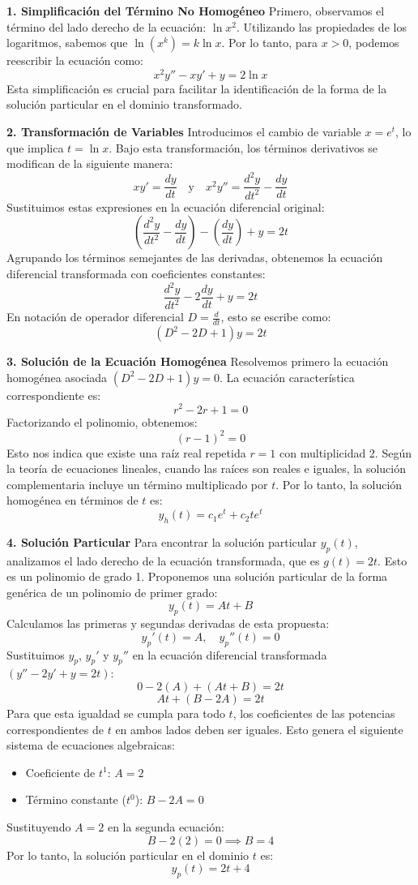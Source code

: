 \documentclass[a4paper]{article}
\begin{document}
\textbf{1. Simplificación del Término No Homogéneo}
Primero, observamos el término del lado derecho de la ecuación: $\ln x^2$. Utilizando las propiedades de los logaritmos, sabemos que $\ln(x^k) = k \ln x$. Por lo tanto, para $x > 0$, podemos reescribir la ecuación como:
$$
x^2y'' - xy' + y = 2 \ln x
$$
Esta simplificación es crucial para facilitar la identificación de la forma de la solución particular en el dominio transformado.

\textbf{2. Transformación de Variables}
Introducimos el cambio de variable $x = e^t$, lo que implica $t = \ln x$. Bajo esta transformación, los términos derivativos se modifican de la siguiente manera:
$$
x y' = \frac{dy}{dt} \quad \text{y} \quad x^2 y'' = \frac{d^2y}{dt^2} - \frac{dy}{dt}
$$
Sustituimos estas expresiones en la ecuación diferencial original:
$$
\left( \frac{d^2y}{dt^2} - \frac{dy}{dt} \right) - \left( \frac{dy}{dt} \right) + y = 2t
$$
Agrupando los términos semejantes de las derivadas, obtenemos la ecuación diferencial transformada con coeficientes constantes:
$$
\frac{d^2y}{dt^2} - 2\frac{dy}{dt} + y = 2t
$$
En notación de operador diferencial $D = \frac{d}{dt}$, esto se escribe como:
$$
(D^2 - 2D + 1)y = 2t
$$

\textbf{3. Solución de la Ecuación Homogénea}
Resolvemos primero la ecuación homogénea asociada $(D^2 - 2D + 1)y = 0$. La ecuación característica correspondiente es:
$$
r^2 - 2r + 1 = 0
$$
Factorizando el polinomio, obtenemos:
$$
(r - 1)^2 = 0
$$
Esto nos indica que existe una raíz real repetida $r = 1$ con multiplicidad 2. Según la teoría de ecuaciones lineales, cuando las raíces son reales e iguales, la solución complementaria incluye un término multiplicado por $t$. Por lo tanto, la solución homogénea en términos de $t$ es:
$$
y_h(t) = c_1 e^{t} + c_2 t e^{t}
$$

\textbf{4. Solución Particular}
Para encontrar la solución particular $y_p(t)$, analizamos el lado derecho de la ecuación transformada, que es $g(t) = 2t$. Esto es un polinomio de grado 1. Proponemos una solución particular de la forma genérica de un polinomio de primer grado:
$$
y_p(t) = At + B
$$
Calculamos las primeras y segundas derivadas de esta propuesta:
$$
y_p'(t) = A, \quad y_p''(t) = 0
$$
Sustituimos $y_p$, $y_p'$ y $y_p''$ en la ecuación diferencial transformada $(y'' - 2y' + y = 2t)$:
$$
0 - 2(A) + (At + B) = 2t
$$
$$
At + (B - 2A) = 2t
$$
Para que esta igualdad se cumpla para todo $t$, los coeficientes de las potencias correspondientes de $t$ en ambos lados deben ser iguales. Esto genera el siguiente sistema de ecuaciones algebraicas:
\begin{itemize}
    \item Coeficiente de $t^1$: $A = 2$
    \item Término constante ($t^0$): $B - 2A = 0$
\end{itemize}
Sustituyendo $A = 2$ en la segunda ecuación:
$$
B - 2(2) = 0 \implies B = 4
$$
Por lo tanto, la solución particular en el dominio $t$ es:
$$
y_p(t) = 2t + 4
$$
\end{document}

